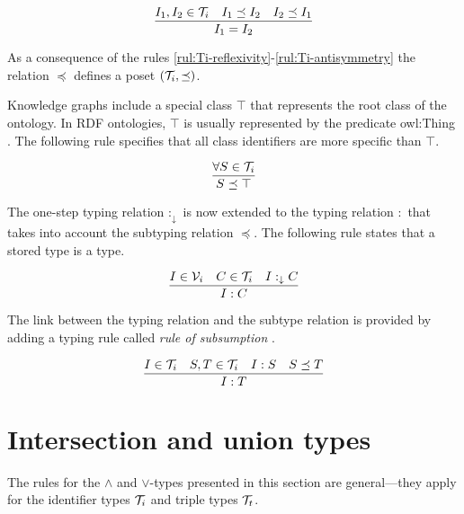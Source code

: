 \documentclass[runningheads]{llncs}
\newcommand{\darr}{\downarrow}
\newcommand{\V}{{\cal V}}
\newcommand{\T}{{\cal T}}
\begin{document}
\begin{equation}
\label{rul:Ti-antisymmetry}
\dfrac{I_1,I_2\in\T_i \quad I_1\preceq\/I_2 \quad I_2\preceq\/I_1}
      {I_1=I_2}   
\end{equation}

As a consequence of the rules
\ref{rul:Ti-reflexivity}-\ref{rul:Ti-antisymmetry} the relation
$\preceq$ defines a poset $(\T_i,\preceq)$.

Knowledge graphs include a special class $\top$ that represents the
root class of the ontology. In RDF ontologies, $\top$ is usually
represented by the predicate owl:Thing \cite{Hoffart2013}. The
following rule specifies that all class identifiers are more specific
than $\top$.

\begin{equation}
\dfrac{\forall\/S\in\T_i}
      {S\preceq\top}
\end{equation}

The one-step typing relation $:_\darr$ is now extended to the typing
relation $:$ that takes into account the subtyping relation $\preceq$.
The following rule states that a stored type is a type.

\begin{equation}
\dfrac{I\in\V_i\quad\/C\in\T_i\quad\/I:_\darr\/C}
      {I:C}
\end{equation}

The link between the typing relation and the subtype relation is
provided by adding a typing rule called \emph{rule of subsumption}
\cite{Pierce2002}.

\begin{equation}
\label{rul:typing-subsumption}
\dfrac{I\in\T_i\quad\/S,T\in\T_i\quad\/I:S\quad\/S\preceq\/T}
      {I:T}    
\end{equation}








\section{Intersection and union types\label{sec:intsc-union}}

The rules for the $\land$ and $\lor$-types presented in this section
are general---they apply for the identifier types $\T_i$ and triple
types $\T_t$.
\end{document}
